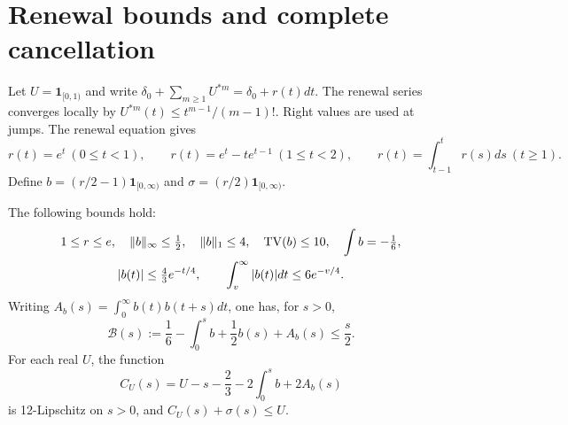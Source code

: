 \section{Renewal bounds and complete cancellation}
Let \(U=\mathbf1_{[0,1)}\) and write
\(\delta_0+\sum_{m\ge1}U^{*m}=\delta_0+r(t)dt\).
The renewal series converges locally by
\(U^{*m}(t)\le t^{m-1}/(m-1)!\). Right values are used at jumps.
The renewal equation gives
\[
 r(t)=e^t\ (0\le t<1),\qquad
 r(t)=e^t-te^{t-1}\ (1\le t<2),\qquad
 r(t)=\int_{t-1}^t r(s)ds\ (t\ge1).
\]
Define \(b=(r/2-1)\mathbf1_{[0,\infty)}\) and
\(\sigma=(r/2)\mathbf1_{[0,\infty)}\).

\begin{lemma}\label{renewal}
The following bounds hold:
\begin{gather*}
 1\le r\le e,\quad \|b\|_\infty\le\tfrac12,\quad
 \|b\|_1\le4,\quad \operatorname{TV}(b)\le10,\quad \int b=-\tfrac16,\\
 |b(t)|\le\tfrac43e^{-t/4},\qquad
 \int_v^\infty|b(t)|dt\le6e^{-v/4}.
\end{gather*}
Writing \(A_b(s)=\int_0^\infty b(t)b(t+s)dt\), one has, for \(s>0\),
\begin{equation}
 \mathcal B(s):=\frac16-\int_0^s b+\frac12b(s)+A_b(s)\le\frac s2.
 \label{cancel}
\end{equation}
For each real \(U\), the function
\begin{equation}
 C_U(s)=U-s-\frac23-2\int_0^s b+2A_b(s)
 \label{CU}
\end{equation}
is 12-Lipschitz on \(s>0\), and \(C_U(s)+\sigma(s)\le U\).
\end{lemma}
